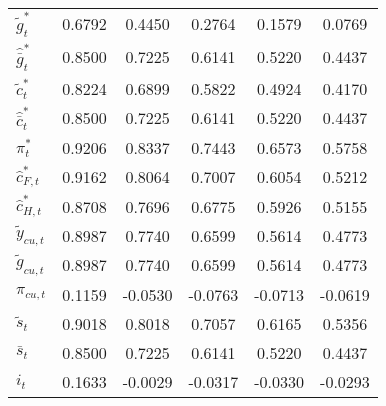 \begin{center}
\begin{longtable}{lccccc}
${\tilde g_t^*}       $	 & 	     0.6792	 & 	     0.4450	 & 	     0.2764	 & 	     0.1579	 & 	     0.0769 \\ 
${\hat {\bar g}_t^*}  $	 & 	     0.8500	 & 	     0.7225	 & 	     0.6141	 & 	     0.5220	 & 	     0.4437 \\ 
${\tilde c_t^*}       $	 & 	     0.8224	 & 	     0.6899	 & 	     0.5822	 & 	     0.4924	 & 	     0.4170 \\ 
${\hat {\bar c}_t^*}  $	 & 	     0.8500	 & 	     0.7225	 & 	     0.6141	 & 	     0.5220	 & 	     0.4437 \\ 
${\pi_t^*}            $	 & 	     0.9206	 & 	     0.8337	 & 	     0.7443	 & 	     0.6573	 & 	     0.5758 \\ 
${\hat c_{F,t}^*}     $	 & 	     0.9162	 & 	     0.8064	 & 	     0.7007	 & 	     0.6054	 & 	     0.5212 \\ 
${\hat c_{H,t}^*}     $	 & 	     0.8708	 & 	     0.7696	 & 	     0.6775	 & 	     0.5926	 & 	     0.5155 \\ 
${\tilde y_{cu,t}}    $	 & 	     0.8987	 & 	     0.7740	 & 	     0.6599	 & 	     0.5614	 & 	     0.4773 \\ 
${\tilde g_{cu,t}}    $	 & 	     0.8987	 & 	     0.7740	 & 	     0.6599	 & 	     0.5614	 & 	     0.4773 \\ 
${\pi_{cu,t}}         $	 & 	     0.1159	 & 	    -0.0530	 & 	    -0.0763	 & 	    -0.0713	 & 	    -0.0619 \\ 
${\tilde s_t}         $	 & 	     0.9018	 & 	     0.8018	 & 	     0.7057	 & 	     0.6165	 & 	     0.5356 \\ 
${\bar s_t}           $	 & 	     0.8500	 & 	     0.7225	 & 	     0.6141	 & 	     0.5220	 & 	     0.4437 \\ 
${i_t}                $	 & 	     0.1633	 & 	    -0.0029	 & 	    -0.0317	 & 	    -0.0330	 & 	    -0.0293 \\ 
\end{longtable}
 \end{center}
